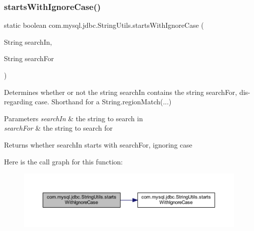 \subsubsection{\texorpdfstring{starts\+With\+Ignore\+Case()}{startsWithIgnoreCase()}\hspace{0.1cm}{\footnotesize\ttfamily [2/2]}}
{\footnotesize\ttfamily static boolean com.\+mysql.\+jdbc.\+String\+Utils.\+starts\+With\+Ignore\+Case (\begin{DoxyParamCaption}\item[{String}]{search\+In,  }\item[{String}]{search\+For }\end{DoxyParamCaption})\hspace{0.3cm}{\ttfamily [static]}}

Determines whether or not the string \textquotesingle{}search\+In\textquotesingle{} contains the string \textquotesingle{}search\+For\textquotesingle{}, dis-\/regarding case. Shorthand for a String.\+region\+Match(...)


\begin{DoxyParams}{Parameters}
{\em search\+In} & the string to search in \\
\hline
{\em search\+For} & the string to search for\\
\hline
\end{DoxyParams}
\begin{DoxyReturn}{Returns}
whether search\+In starts with search\+For, ignoring case 
\end{DoxyReturn}
Here is the call graph for this function\+:
\nopagebreak
\begin{figure}[H]
\begin{center}
\leavevmode
\includegraphics[width=350pt]{classcom_1_1mysql_1_1jdbc_1_1_string_utils_a3d79ea63bb33aa848246c4c41e1d4df0_cgraph}
\end{center}
\end{figure}
\mbox{\label{classcom_1_1mysql_1_1jdbc_1_1_string_utils_a9e913ad5a1846fd695d58c3b7b3719de}} 
